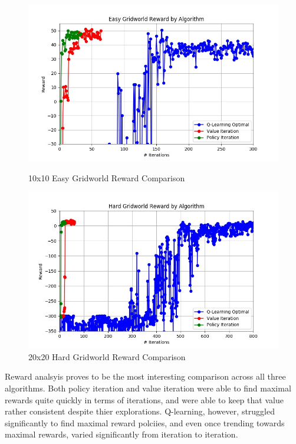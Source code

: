 \documentclass[h]{article}
\begin{document}
  \begin{figure}[H]
   \endminipage\hfill
      \includegraphics[width=1\textwidth,keepaspectratio]{easy_reward.jpg} 
      \caption*{10x10 Easy Gridworld Reward Comparison} 
   \endminipage\hfill
      \includegraphics[width=1\textwidth,keepaspectratio]{hard_reward.jpg} 
      \caption*{20x20 Hard Gridworld Reward Comparison} 
   \endminipage\hfill
   \endminipage\hfill
\end{figure}
Reward analsyis proves to be the most interesting comparison across all three 
algorithms.  Both policy iteration and value iteration were able to find maximal 
rewards quite quickly in terms of iterations, and were able to keep that value 
rather consistent despite thier explorations.  Q-learning, however, struggled 
significantly to find maximal reward polciies, and even once trending towards 
maximal rewards, varied significantly from iteration to iteration.
\end{document}
